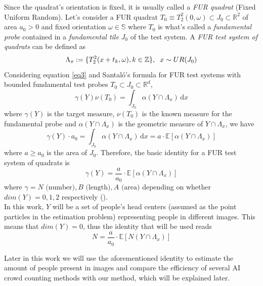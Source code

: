 Since the quadrat's orientation is fixed, it is usually called a \textit{FUR quadrat} (Fixed Uniform Random). Let's consider a FUR quadrat $T_0 \equiv T_2^2(0,\omega) \subset J_0 \subset \mathbb{R}^2$ of area $a_0 > 0$ and fixed orientation $\omega \in \mathbb{S}$ where $T_0$ is what's called a \textit{fundamental probe} contained in a \textit{fundamental tile} $J_0$ of the test system. A \textit{FUR test system of quadrats} can be defined as 
\begin{equation*}
    \Lambda_x := \{ T_2^2(x+t_k,\omega), k\in \mathbb{Z} \}, \hspace{2mm} x \sim UR(J_0)
\end{equation*}
Considering equation \eqref{eq3} and Santaló's formula for FUR test systems with bounded fundamental test probes $T_0\subset J_0\subset \mathbb{R}^d$,
\begin{equation*}
    \gamma(Y)\nu(T_0)=\int_{J_0}  \alpha(Y\cap \Lambda_x)\,\mathrm{d}x
\end{equation*}
where $\gamma(Y)$ is the target measure, $\nu(T_0)$ is the known measure for the fundamental probe and $\alpha(Y\cap \Lambda_x)$ is the geometric measure of $Y\cap \Lambda_x$, we have
\begin{equation*}
    \gamma(Y)\cdot a_0 = \int_{J_0}  \alpha(Y\cap \Lambda_x)\,\mathrm{d}x = a\cdot \mathbb{E}[\alpha(Y\cap \Lambda_x)]
\end{equation*}
where $a\geq a_0$ is the area of $J_0$. Therefore, the basic identity for a FUR test system of quadrats is
\begin{equation} \label{conteo}
    \gamma(Y)=\frac{a}{a_0}\cdot \mathbb{E}[\alpha(Y\cap \Lambda_x)]
\end{equation}
where $\gamma = N \text{ (number)},B \text{ (length)},A \text{ (area)}$ depending on whether $dim(Y)=0,1,2$ respectively (\cite{SterThAppl-2022-07-21.pdf}).\\

In this work, $Y$ will be a set of people's head centers (assumed as the point particles in the estimation problem) representing people in different images. This means that $dim(Y)=0$, thus the identity that will be used reads
\begin{equation} \label{Conteo_usada}
    N =\frac{a}{a_0}\cdot \mathbb{E}[N(Y\cap \Lambda_x)]
\end{equation}

Later in this work we will use the aforementioned identity to estimate the amount of people present in images and compare the efficiency of several AI crowd counting methods with our method, which will be explained later.\\





